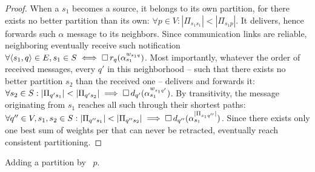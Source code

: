 \begin{proof}
  When a \process $s_1$ becomes a source, it belongs to its own
  partition, for there exists no better partition than its own:
  $\forall p \in V: |\Pi_{s_1 s_1}| < |\Pi_{s_1 p}|$. It delivers,
  hence forwards such $\alpha$ message to its neighbors. Since
  communication links are reliable, neighboring \processes eventually
  receive such notification $\forall \langle s_1, q \rangle \in E, s_1
  \in S \iff \square\, r_q(\alpha_{s_1}^{w_{s_1 q}})$. Most
  importantly, whatever the order of received messages, every \process
  $q'$ in this neighborhood -- such that there exists no better
  partition $s_2$ than the received one -- delivers and forwards it:
  $\forall s_2 \in S: |\Pi_{q' s_1}| < |\Pi_{q' s_2}| \implies
  \square\, d_{q'}(\alpha_{s_1}^{w_{s_1 q'}})$. By transitivity, the
  message originating from $s_1$ reaches all such \processes through
  their shortest paths: $\forall q'' \in V, s_1, s_2 \in S: |\Pi_{q''
    s_1}| < |\Pi_{q'' s_2}| \implies \square\,
  d_{q''}(\alpha_{s_1}^{|\Pi_{s_1 q''}|})$.  Since there exists only
  one best sum of weights per \process that can never be retracted,
  \processes eventually reach consistent partitioning.
\end{proof}

\begin{algorithm}
  
  \caption{\label{algo:add}Adding a partition by \Process~$p$.}
\end{algorithm}

